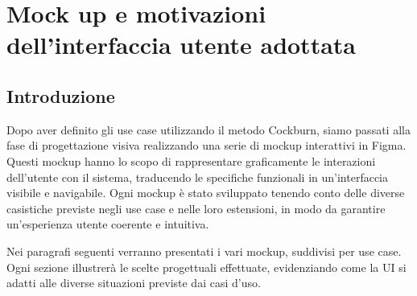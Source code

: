 \newpage
\section{Mock up e motivazioni dell’interfaccia utente adottata}
\subsection*{Introduzione}
Dopo aver definito gli use case utilizzando il metodo Cockburn, siamo passati alla fase di progettazione visiva realizzando una serie di mockup interattivi in Figma. Questi mockup hanno lo scopo di rappresentare graficamente le interazioni dell'utente con il sistema, traducendo le specifiche funzionali in un'interfaccia visibile e navigabile. Ogni mockup è stato sviluppato tenendo conto delle diverse casistiche previste negli use case e nelle loro estensioni, in modo da garantire un’esperienza utente coerente e intuitiva.

Nei paragrafi seguenti verranno presentati i vari mockup, suddivisi per use case. Ogni sezione illustrerà le scelte progettuali effettuate, evidenziando come la UI si adatti alle diverse situazioni previste dai casi d'uso.



\clearpage
\newpage






\clearpage
\newpage



\clearpage
\newpage
